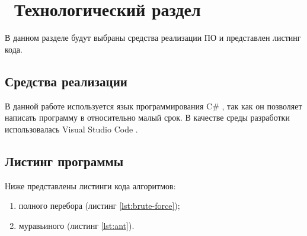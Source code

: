 \chapter{ Технологический раздел}
\label{cha:technological}

    В данном разделе будут выбраны средства реализации ПО и представлен листинг кода. 

    \section{Средства реализации}
        В данной работе используется язык программирования C\# \cite{csharp}, так как
        он позволяет написать программу в относительно малый срок.
        В качестве среды разработки использовалась Visual Studio Code \cite{visual-studio-code}. 


    \section{Листинг программы}
        Ниже представлены листинги кода алгоритмов:
        \begin{enumerate}
            \item полного перебора (листинг \ref{lst:brute-force});
            \item муравьиного (листинг \ref{lst:ant}).
        \end{enumerate}
        
